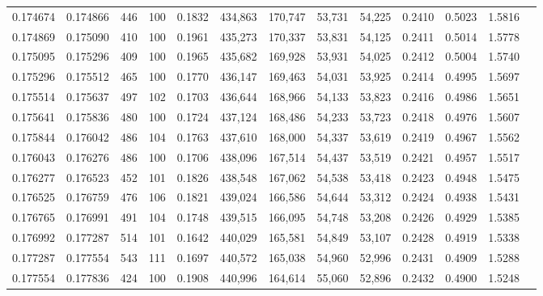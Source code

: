 \begin{tabular}{rrrrrrrrrrrrr}
0.174674 & 0.174866 &   446 & 100 &                                     0.1832 & 434,863 & 170,747 &  53,731 &  54,225 & 0.2410 & 0.5023 & 1.5816 \\
0.174869 & 0.175090 &   410 & 100 &                                     0.1961 & 435,273 & 170,337 &  53,831 &  54,125 & 0.2411 & 0.5014 & 1.5778 \\
0.175095 & 0.175296 &   409 & 100 &                                     0.1965 & 435,682 & 169,928 &  53,931 &  54,025 & 0.2412 & 0.5004 & 1.5740 \\
0.175296 & 0.175512 &   465 & 100 &                                     0.1770 & 436,147 & 169,463 &  54,031 &  53,925 & 0.2414 & 0.4995 & 1.5697 \\
0.175514 & 0.175637 &   497 & 102 &                                     0.1703 & 436,644 & 168,966 &  54,133 &  53,823 & 0.2416 & 0.4986 & 1.5651 \\
0.175641 & 0.175836 &   480 & 100 &                                     0.1724 & 437,124 & 168,486 &  54,233 &  53,723 & 0.2418 & 0.4976 & 1.5607 \\
0.175844 & 0.176042 &   486 & 104 &                                     0.1763 & 437,610 & 168,000 &  54,337 &  53,619 & 0.2419 & 0.4967 & 1.5562 \\
0.176043 & 0.176276 &   486 & 100 &                                     0.1706 & 438,096 & 167,514 &  54,437 &  53,519 & 0.2421 & 0.4957 & 1.5517 \\
0.176277 & 0.176523 &   452 & 101 &                                     0.1826 & 438,548 & 167,062 &  54,538 &  53,418 & 0.2423 & 0.4948 & 1.5475 \\
0.176525 & 0.176759 &   476 & 106 &                                     0.1821 & 439,024 & 166,586 &  54,644 &  53,312 & 0.2424 & 0.4938 & 1.5431 \\
0.176765 & 0.176991 &   491 & 104 &                                     0.1748 & 439,515 & 166,095 &  54,748 &  53,208 & 0.2426 & 0.4929 & 1.5385 \\
0.176992 & 0.177287 &   514 & 101 &                                     0.1642 & 440,029 & 165,581 &  54,849 &  53,107 & 0.2428 & 0.4919 & 1.5338 \\
0.177287 & 0.177554 &   543 & 111 &                                     0.1697 & 440,572 & 165,038 &  54,960 &  52,996 & 0.2431 & 0.4909 & 1.5288 \\
0.177554 & 0.177836 &   424 & 100 &                                     0.1908 & 440,996 & 164,614 &  55,060 &  52,896 & 0.2432 & 0.4900 & 1.5248 \\

\end{tabular}
